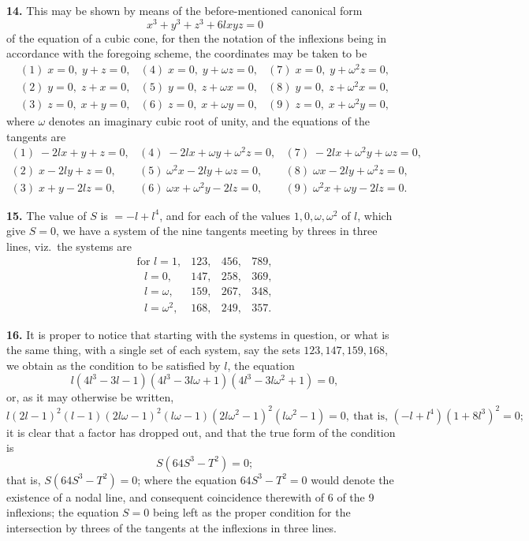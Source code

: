 \documentclass[11pt,a4paper]{article}
\begin{document}
\textbf{14.} This may be shown by means of the before-mentioned canonical form
\[
x^{3} + y^{3} + z^{3} + 6lxyz = 0
\]
of the equation of a cubic cone, for then the notation of the inflexions being in accordance with the foregoing scheme, the coordinates may be taken to be
\[
\begin{array}{lll}
(1)\; x = 0,\; y + z = 0, & (4)\; x = 0,\; y + \omega z = 0, & (7)\; x = 0,\; y + \omega^{2} z = 0,\\
(2)\; y = 0,\; z + x = 0, & (5)\; y = 0,\; z + \omega x = 0, & (8)\; y = 0,\; z + \omega^{2} x = 0,\\
(3)\; z = 0,\; x + y = 0, & (6)\; z = 0,\; x + \omega y = 0, & (9)\; z = 0,\; x + \omega^{2} y = 0,
\end{array}
\]
where $\omega$ denotes an imaginary cubic root of unity, and the equations of the tangents are
\[
\begin{array}{lll}
(1)\; -2lx + y + z = 0, & (4)\; -2lx + \omega y + \omega^{2} z = 0, & (7)\; -2lx + \omega^{2} y + \omega z = 0,\\
(2)\; x - 2ly + z = 0, & (5)\; \omega^{2} x - 2ly + \omega z = 0, & (8)\; \omega x - 2ly + \omega^{2} z = 0,\\
(3)\; x + y - 2lz = 0, & (6)\; \omega x + \omega^{2} y - 2lz = 0, & (9)\; \omega^{2} x + \omega y - 2lz = 0.
\end{array}
\]

\textbf{15.} The value of $S$ is $= -l + l^{4}$, and for each of the values $1, 0, \omega, \omega^{2}$ of $l$, which give $S = 0$, we have a system of the nine tangents meeting by threes in three lines, viz.\ the systems are
\[
\begin{array}{lccc}
\text{for } l = 1, & 123, & 456, & 789,\\
\text{\ \ \ } l = 0, & 147, & 258, & 369,\\
\text{\ \ \ } l = \omega, & 159, & 267, & 348,\\
\text{\ \ \ } l = \omega^{2}, & 168, & 249, & 357.
\end{array}
\]

\textbf{16.} It is proper to notice that starting with the systems in question, or what is the same thing, with a single set of each system, say the sets $123, 147, 159, 168$, we obtain as the condition to be satisfied by $l$, the equation
\[
l(4l^{3} - 3l - 1)(4l^{3} - 3l\omega + 1)(4l^{3} - 3l\omega^{2} + 1) = 0,
\]
or, as it may otherwise be written,
\[
l(2l - 1)^{2}(l - 1)(2l\omega - 1)^{2}(l\omega - 1)(2l\omega^{2} - 1)^{2}(l\omega^{2} - 1) = 0,\ \text{that is, } (-l + l^{4})(1 + 8l^{3})^{2} = 0;
\]
it is clear that a factor has dropped out, and that the true form of the condition is
\[
S(64S^{3} - T^{2}) = 0;
\]
that is, $S(64S^{3} - T^{2}) = 0$; where the equation $64S^{3} - T^{2} = 0$ would denote the existence of a nodal line, and consequent coincidence therewith of 6 of the 9 inflexions; the equation $S = 0$ being left as the proper condition for the intersection by threes of the tangents at the inflexions in three lines.
\end{document}
